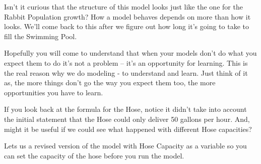 \documentclass[]{memoir}
\begin{document}
Isn't it curious that the structure of this model looks just like the
one for the Rabbit Population growth? How a model behaves depends on
more than how it looks. We'll come back to this after we figure out how
long it's going to take to fill the Swimming Pool.

Hopefully you will come to understand that when your models don't do
what you expect them to do it's not a problem -- it's an opportunity for
learning. This is the real reason why we do modeling - to understand and
learn. Just think of it as, the more things don't go the way you expect
them too, the more opportunities you have to learn.

If you look back at the formula for the Hose, notice it didn't take into
account the initial statement that the Hose could only deliver 50
gallons per hour. And, might it be useful if we could see what happened
with different Hose capacities?

Lets us a revised version of the model with Hose Capacity as a variable
so you can set the capacity of the hose before you run the model.

\FloatBarrier 
\end{document}
